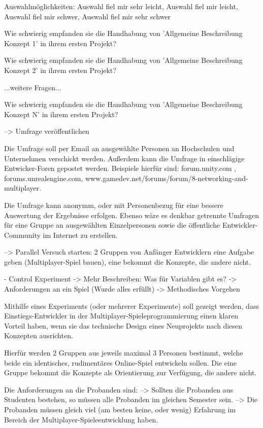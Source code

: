 Auswahlmöglichkeiten: Auswahl fiel mir sehr leicht, Auswahl fiel mir leicht, Auswahl fiel mir schwer, Auswahl fiel mir sehr schwer

Wie schwierig empfanden sie die Handhabung von 'Allgemeine Beschreibung Konzept 1' in ihrem ersten Projekt?

Wie schwierig empfanden sie die Handhabung von 'Allgemeine Beschreibung Konzept 2' in ihrem ersten Projekt?

...weitere Fragen...

Wie schwierig empfanden sie die Handhabung von 'Allgemeine Beschreibung Konzept N' in ihrem ersten Projekt?

--> Umfrage veröffentlichen

Die Umfrage soll per Email an ausgewählte Personen an Hochschulen und Unternehmen verschickt werden. Außerdem kann die Umfrage in einschlägige Entwicker-Foren gepostet werden. Beispiele hierfür sind: forum.unity.com , forums.unrealengine.com, www.gamedev.net/forums/forum/8-networking-and-multiplayer.

Die Umfrage kann anonymm, oder mit Personenbezug für eine bessere Auswertung der Ergebnisse erfolgen. Ebenso wäre es denkbar getrennte Umfragen für eine Gruppe an ausgewählten Einzelpersonen sowie die öffentliche Entwickler-Community im Internet zu erstellen.

--> Parallel Versuch starten: 2 Gruppen von Anfänger Entwicklern eine Aufgabe geben (Multiplayer-Spiel bauen), eine bekommt die Konzepte, die andere nicht.

- Control Experiment -> Mehr Beschreiben: Was für Variablen gibt es?
-> Anforderungen an ein Spiel (Wurde alles erfüllt)
-> Methodisches Vorgehen

Mithilfe eines Experiments (oder mehrerer Experimente) soll gezeigt werden, dass Einstiegs-Entwickler in der Multiplayer-Spieleprogrammierung einen klaren Vorteil haben, wenn sie das technische Design eines Neuprojekts nach diesen Konzepten ausrichten.

Hierfür werden 2 Gruppen aus jeweils maximal 3 Personen bestimmt, welche beide ein identisches, rudimentäres Online-Spiel entwickeln sollen. Die eine Gruppe bekommt die Konzepte als Orientierung zur Verfügung, die andere nicht.

Die Anforderungen an die Probanden sind:
--> Sollten die Probanden aus Studenten bestehen, so müssen alle Probanden im gleichen Semester sein.
--> Die Probanden müssen gleich viel (am besten keine, oder wenig) Erfahrung im Bereich der Multiplayer-Spieleentwicklung haben.

